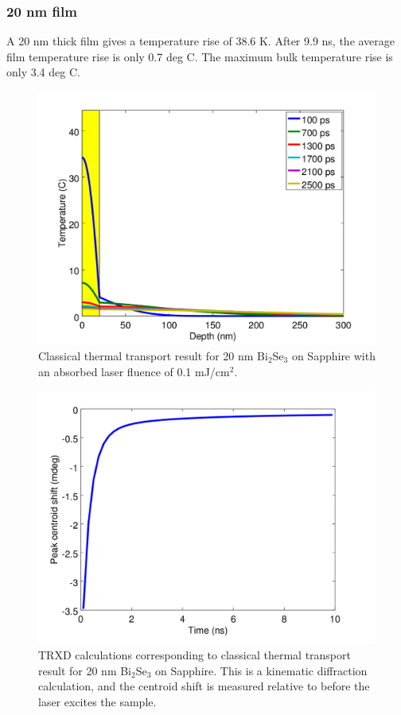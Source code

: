 \documentclass[letterpaper,11pt]{article}
\begin{document}
\subsubsection{20 nm film}
A 20 nm thick film gives a temperature rise of 38.6 K.  After 9.9 ns, the average film temperature rise is only 0.7 deg C.  The maximum bulk temperature rise is only 3.4 deg C.
\begin{figure}[h]
\includegraphics[scale = 0.5]{TempProfile20.png}
\caption{Classical thermal transport result for 20 nm Bi$_2$Se$_3$ on Sapphire  with an absorbed laser fluence of 0.1 mJ/cm$^2$.}
\end{figure}
\begin{figure}[h]
\includegraphics[scale = 0.5]{CentroidShift20.png}
\caption{TRXD calculations corresponding to classical thermal transport result for 20 nm Bi$_2$Se$_3$ on Sapphire.  This is a kinematic diffraction calculation, and the centroid shift is measured relative to before the laser excites the sample.}
\end{figure}
\newpage
\end{document}
